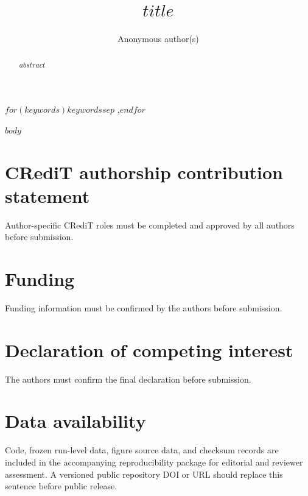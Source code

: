 \documentclass[preprint,12pt]{elsarticle}
\begin{document}
\begin{frontmatter}
\title{$title$}
\author[inst1]{Anonymous author(s)}
\address[inst1]{Author names, affiliations, and corresponding-author details must be inserted before submission.}
\begin{abstract}
$abstract$
\end{abstract}
\begin{keyword}
$for(keywords)$$keywords$$sep$ \sep $endfor$
\end{keyword}
\end{frontmatter}
$body$
\section*{CRediT authorship contribution statement}
Author-specific CRediT roles must be completed and approved by all authors before submission.
\section*{Funding}
Funding information must be confirmed by the authors before submission.
\section*{Declaration of competing interest}
The authors must confirm the final declaration before submission.
\section*{Data availability}
Code, frozen run-level data, figure source data, and checksum records are included in the accompanying reproducibility package for editorial and reviewer assessment. A versioned public repository DOI or URL should replace this sentence before public release.


\end{document}
